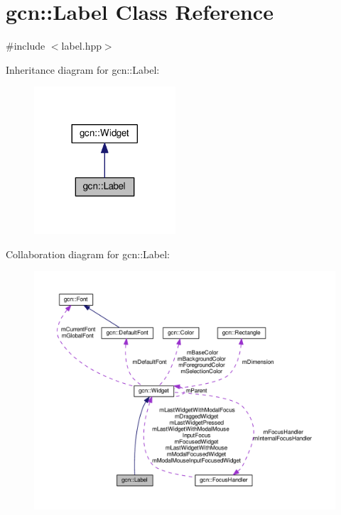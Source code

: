 \hypertarget{classgcn_1_1Label}{}\section{gcn\+:\+:Label Class Reference}
\label{classgcn_1_1Label}


{\ttfamily \#include $<$label.\+hpp$>$}



Inheritance diagram for gcn\+:\+:Label\+:\nopagebreak
\begin{figure}[H]
\begin{center}
\leavevmode
\includegraphics[width=149pt]{classgcn_1_1Label__inherit__graph}
\end{center}
\end{figure}


Collaboration diagram for gcn\+:\+:Label\+:\nopagebreak
\begin{figure}[H]
\begin{center}
\leavevmode
\includegraphics[width=350pt]{classgcn_1_1Label__coll__graph}
\end{center}
\end{figure}
